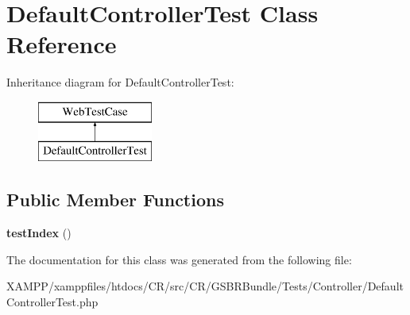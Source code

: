 \section{Default\+Controller\+Test Class Reference}
\label{class_c_r_1_1_g_s_b_r_bundle_1_1_tests_1_1_controller_1_1_default_controller_test}
Inheritance diagram for Default\+Controller\+Test\+:\begin{figure}[H]
\begin{center}
\leavevmode
\includegraphics[height=2.000000cm]{class_c_r_1_1_g_s_b_r_bundle_1_1_tests_1_1_controller_1_1_default_controller_test}
\end{center}
\end{figure}
\subsection*{Public Member Functions}
\begin{DoxyCompactItemize}
\item 
{\bfseries test\+Index} ()\label{class_c_r_1_1_g_s_b_r_bundle_1_1_tests_1_1_controller_1_1_default_controller_test_a0d5e64d219e7d25c074c5d022306dd9f}

\end{DoxyCompactItemize}


The documentation for this class was generated from the following file\+:\begin{DoxyCompactItemize}
\item 
X\+A\+M\+P\+P/xamppfiles/htdocs/\+C\+R/src/\+C\+R/\+G\+S\+B\+R\+Bundle/\+Tests/\+Controller/Default\+Controller\+Test.\+php\end{DoxyCompactItemize}

